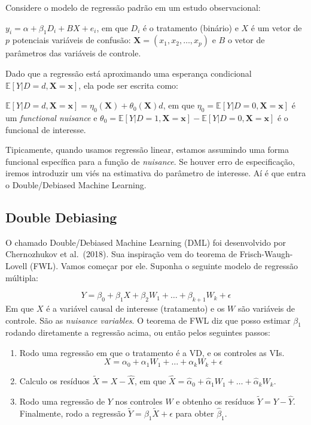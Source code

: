 \documentclass[
]{article}
\begin{document}
Considere o modelo de regressão padrão em um estudo observacional:

\(y_i = \alpha + \beta_1D_i + BX + e_i\), em que \(D_i\) é o tratamento (binário) e \(X\) é um vetor de \(p\) potenciais variáveis de confusão: \(\mathbf{X} = (x_1, x_2, \ldots, x_p)\) e \(B\) o vetor de parâmetros das variáveis de controle.

Dado que a regressão está aproximando uma esperança condicional \(\mathbb{E}[Y|D=d, \mathbf{X}= \mathbf{x}]\), ela pode ser escrita como:

\(\mathbb{E}[Y|D=d, \mathbf{X}= \mathbf{x}] = \eta_0(\mathbf{X}) + \theta_0(\mathbf{X})d\), em que \(\eta_0 = \mathbb{E}[Y|D=0, \mathbf{X}= \mathbf{x}]\) é um \emph{functional nuisance} e \(\theta_0 = \mathbb{E}[Y|D=1, \mathbf{X}= \mathbf{x}] - \mathbb{E}[Y|D=0, \mathbf{X}= \mathbf{x}]\) é o funcional de interesse.

Tipicamente, quando usamos regressão linear, estamos assumindo uma forma funcional específica para a função de \emph{nuisance}. Se houver erro de especificação, iremos introduzir um viés na estimativa do parâmetro de interesse. Aí é que entra o Double/Debiased Machine Learning.

\subsection{Double Debiasing}\label{double-debiasing}

O chamado Double/Debiased Machine Learning (DML) foi desenvolvido por Chernozhukov et al.~(2018). Sua inspiração vem do teorema de Frisch-Waugh-Lovell (FWL). Vamos começar por ele. Suponha o seguinte modelo de regressão múltipla:

\[
Y = \beta_0 + \beta_1X + \beta_2W_1 + \dots + \beta_{k+1}W_k + \epsilon
\]
Em que \(X\) é a variável causal de interesse (tratamento) e os \(W\) são variáveis de controle. São as \emph{nuisance variables}. O teorema de FWL diz que posso estimar \(\beta_1\) rodando diretamente a regressão acima, ou então pelos seguintes passos:

\begin{enumerate}
\def\labelenumi{\arabic{enumi}.}
\item
  Rodo uma regressão em que o tratamento é a VD, e os controles as VIs.
  \[
  X = \alpha_0 +  \alpha_1W_1 + \dots + \alpha_{k}W_k + \epsilon
  \]
\item
  Calculo os resíduos \(\tilde{X} = X - \hat{X}\), em que \(\hat{X} = \hat{\alpha}_0 +  \hat{\alpha}_1W_1 + \dots + \hat{\alpha}_{k}W_k\).
\item
  Rodo uma regressão de \(Y\) nos controles \(W\) e obtenho os resíduos \(\tilde{Y} = Y - \hat{Y}\). Finalmente, rodo a regressão \(\tilde{Y} = \beta_1 \tilde{X} + \epsilon\) para obter \(\hat{\beta}_1\).
\end{enumerate}
\end{document}
